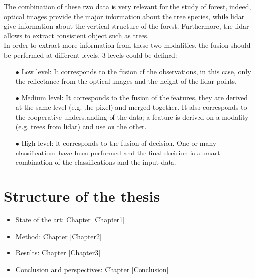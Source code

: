 The combination of these two data is very relevant for the study of forest, indeed, optical images provide the major information about the tree species, while lidar give information about the vertical structure of the forest. Furthermore, the lidar allows to extract consistent object such as trees. \\

In order to extract more information from these two modalities, the fusion should be performed at different levels. 3 levels could be defined:
\begin{itemize}
\item[$\bullet$] Low level: It corresponds to the fusion of the observations, in this case, only the reflectance from the optical images and the height of the lidar points.
\item[$\bullet$] Medium level: It corresponds to the fusion of the features, they are derived at the same level (e.g. the pixel) and merged together. It also corresponds to the cooperative understanding of the data; a feature is derived on a modality (e.g. trees from lidar) and use on the other.
\item[$\bullet$] High level: It corresponds to the fusion of decision. One or many classifications have been performed and the final decision is a smart combination of the classifications and the input data.
\end{itemize}

\section{Structure of the thesis}

\begin{itemize}
\item State of the art: Chapter \ref{Chapter1}
\item Method: Chapter \ref{Chapter2}
\item Results: Chapter \ref{Chapter3}
\item Conclusion and perspectives: Chapter \ref{Conclusion}
\end{itemize}

\stopcontents[chapters]

